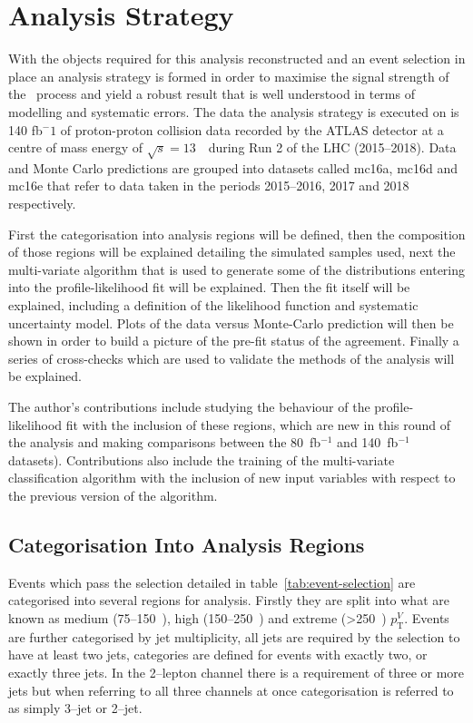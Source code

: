 \chapter{Analysis Strategy}%
\label{ch:strategy}

With the objects required for this analysis reconstructed and an event selection
in place an analysis strategy is formed in order to maximise the signal strength
of the \VHbb\ process and yield a robust result that is well understood in terms
of modelling and systematic errors. The data the analysis strategy is executed
on is 140 fb${^-1}$ of proton-proton collision data recorded by the ATLAS
detector at a centre of mass energy of $\sqrt{s} = 13$~\TeV\ during Run 2 of the
LHC (2015--2018). Data and Monte Carlo predictions are grouped into datasets
called mc16a, mc16d and mc16e that refer to data taken in the periods
2015--2016, 2017 and 2018 respectively.

First the categorisation into analysis regions will be defined, then the
composition of those regions will be explained detailing the simulated samples
used, next the multi-variate algorithm that is used to generate some of the
distributions entering into the profile-likelihood fit will be explained. Then
the fit itself will be explained, including a definition of the likelihood
function and systematic uncertainty model. Plots of the data versus Monte-Carlo
prediction will then be shown in order to build a picture of the pre-fit status
of the agreement. Finally a series of cross-checks which are used to validate
the methods of the analysis will be explained.

The author's contributions include studying the behaviour of the
profile-likelihood fit with the inclusion of these regions, which are new in
this round of the analysis and making comparisons between the 80~fb$^{-1}$ and
140~fb$^{-1}$ datasets). Contributions also include the training of the
multi-variate classification algorithm with the inclusion of new input variables
with respect to the previous version of the algorithm.

\section{Categorisation Into Analysis Regions}
\label{sec:ana-regions}

Events which pass the selection detailed in table~\ref{tab:event-selection} are
categorised into several regions for analysis. Firstly they are split into what
are known as medium (75--150~\GeV), high (150--250~\GeV) and extreme (>250~\GeV)
$p_{\mathrm{T}}^{V}$. Events are further categorised by jet multiplicity, all
jets are required by the selection to have at least two jets, categories are
defined for events with exactly two, or exactly three jets. In the 2--lepton
channel there is a requirement of three or more jets but when referring to all
three channels at once categorisation is referred to as simply 3--jet or 2--jet.

